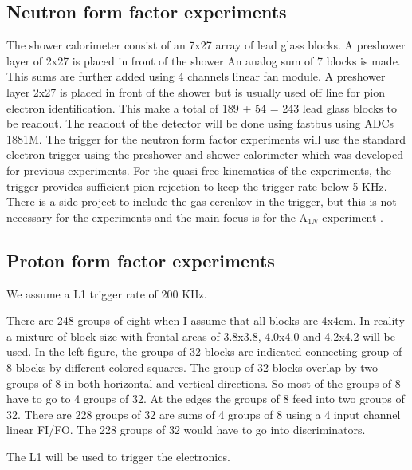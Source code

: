 \documentclass{article}
\begin{document}
\subsection{Neutron form factor experiments}
\label{sec:neutron-trig}
The shower calorimeter consist of an 7x27 array of  lead glass blocks. A preshower layer of 2x27 is placed in front of the shower
An analog sum of 7 blocks is made. This sums are further added using 4 channels linear fan module.
A preshower layer 2x27 is placed in front of the shower but is usually used off line for pion electron identification. 
This make a total of 189 + 54 = 243 lead glass blocks to be readout.
The readout of the detector will be done using fastbus using ADCs 1881M.
 The trigger for the neutron form factor experiments will use the 
standard electron trigger using the preshower and shower calorimeter which was developed for previous experiments. 
For the quasi-free kinematics of the experiments, the trigger provides sufficient pion rejection to keep the
trigger rate below 5 KHz. There is a side project to include the gas cerenkov in the trigger, but this
is not necessary for the experiments and the main focus is for the A$_{1N}$ experiment .

\subsection{Proton form factor experiments}

We assume a L1 trigger rate of 200 KHz. 

There are 248 groups
of eight when I assume that all blocks are 4x4cm. In reality a mixture
of block size with frontal areas of 3.8x3.8, 4.0x4.0 and 4.2x4.2 will be
used. In the left figure, the groups of 32 blocks are indicated connecting
group of 8 blocks by different colored squares. The group of 32 blocks overlap
by two groups of 8 in both horizontal and vertical directions. So most of the
groups of 8 have to go to 4 groups of 32. At the edges the groups of 8 feed into
two groups of 32. There are 228  groups of 32 are sums of 4 groups of 8 using
a 4 input channel linear FI/FO. The 228 groups of 32 would have to
go into discriminators.

The L1 will be used to trigger the  electronics.
\end{document}
